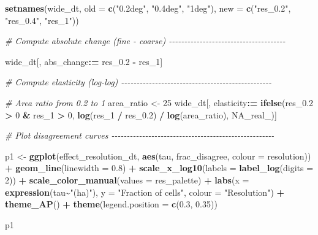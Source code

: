 \documentclass[
  11pt,
]{article}
\newenvironment{Shaded}{\begin{snugshade}}{\end{snugshade}}
\newcommand{\AttributeTok}[1]{\textcolor[rgb]{0.13,0.29,0.53}{#1}}
\newcommand{\CommentTok}[1]{\textcolor[rgb]{0.56,0.35,0.01}{\textit{#1}}}
\newcommand{\ConstantTok}[1]{\textcolor[rgb]{0.56,0.35,0.01}{#1}}
\newcommand{\DecValTok}[1]{\textcolor[rgb]{0.00,0.00,0.81}{#1}}
\newcommand{\FloatTok}[1]{\textcolor[rgb]{0.00,0.00,0.81}{#1}}
\newcommand{\FunctionTok}[1]{\textcolor[rgb]{0.13,0.29,0.53}{\textbf{#1}}}
\newcommand{\NormalTok}[1]{#1}
\newcommand{\OtherTok}[1]{\textcolor[rgb]{0.56,0.35,0.01}{#1}}
\newcommand{\SpecialCharTok}[1]{\textcolor[rgb]{0.81,0.36,0.00}{\textbf{#1}}}
\newcommand{\StringTok}[1]{\textcolor[rgb]{0.31,0.60,0.02}{#1}}
\begin{document}
\begin{Shaded}
\begin{Highlighting}[]
\FunctionTok{setnames}\NormalTok{(wide\_dt, }\AttributeTok{old =} \FunctionTok{c}\NormalTok{(}\StringTok{"0.2deg"}\NormalTok{, }\StringTok{"0.4deg"}\NormalTok{, }\StringTok{"1deg"}\NormalTok{), }\AttributeTok{new =} \FunctionTok{c}\NormalTok{(}\StringTok{"res\_0.2"}\NormalTok{, }\StringTok{"res\_0.4"}\NormalTok{, }\StringTok{"res\_1"}\NormalTok{))}

\CommentTok{\# Compute absolute change (fine {-} coarse) {-}{-}{-}{-}{-}{-}{-}{-}{-}{-}{-}{-}{-}{-}{-}{-}{-}{-}{-}{-}{-}{-}{-}{-}{-}{-}{-}{-}{-}{-}{-}{-}{-}{-}{-}{-}{-}{-}}

\NormalTok{wide\_dt[, abs\_change}\SpecialCharTok{:=}\NormalTok{ res\_0}\FloatTok{.2} \SpecialCharTok{{-}}\NormalTok{ res\_1]}

\CommentTok{\# Compute elasticity (log{-}log) {-}{-}{-}{-}{-}{-}{-}{-}{-}{-}{-}{-}{-}{-}{-}{-}{-}{-}{-}{-}{-}{-}{-}{-}{-}{-}{-}{-}{-}{-}{-}{-}{-}{-}{-}{-}{-}{-}{-}{-}{-}{-}{-}{-}{-}{-}{-}{-}{-}}

\CommentTok{\# Area ratio from 0.2 to 1}
\NormalTok{area\_ratio }\OtherTok{\textless{}{-}} \DecValTok{25}
\NormalTok{wide\_dt[, elasticity}\SpecialCharTok{:=} \FunctionTok{ifelse}\NormalTok{(res\_0}\FloatTok{.2} \SpecialCharTok{\textgreater{}} \DecValTok{0} \SpecialCharTok{\&}\NormalTok{ res\_1 }\SpecialCharTok{\textgreater{}} \DecValTok{0}\NormalTok{,}
                              \FunctionTok{log}\NormalTok{(res\_1 }\SpecialCharTok{/}\NormalTok{ res\_0}\FloatTok{.2}\NormalTok{) }\SpecialCharTok{/} \FunctionTok{log}\NormalTok{(area\_ratio), }\ConstantTok{NA\_real\_}\NormalTok{)]}

\CommentTok{\# Plot disagreement curves {-}{-}{-}{-}{-}{-}{-}{-}{-}{-}{-}{-}{-}{-}{-}{-}{-}{-}{-}{-}{-}{-}{-}{-}{-}{-}{-}{-}{-}{-}{-}{-}{-}{-}{-}{-}{-}{-}{-}{-}{-}{-}{-}{-}{-}{-}{-}{-}{-}{-}{-}{-}{-}}

\NormalTok{p1 }\OtherTok{\textless{}{-}} \FunctionTok{ggplot}\NormalTok{(effect\_resolution\_dt, }\FunctionTok{aes}\NormalTok{(tau, frac\_disagree, }\AttributeTok{colour =}\NormalTok{ resolution)) }\SpecialCharTok{+}
  \FunctionTok{geom\_line}\NormalTok{(}\AttributeTok{linewidth =} \FloatTok{0.8}\NormalTok{) }\SpecialCharTok{+}
  \FunctionTok{scale\_x\_log10}\NormalTok{(}\AttributeTok{labels =} \FunctionTok{label\_log}\NormalTok{(}\AttributeTok{digits =} \DecValTok{2}\NormalTok{)) }\SpecialCharTok{+}
  \FunctionTok{scale\_color\_manual}\NormalTok{(}\AttributeTok{values =}\NormalTok{ res\_palette) }\SpecialCharTok{+}
  \FunctionTok{labs}\NormalTok{(}\AttributeTok{x =} \FunctionTok{expression}\NormalTok{(tau}\SpecialCharTok{\textasciitilde{}}\StringTok{"(ha)"}\NormalTok{),}
       \AttributeTok{y =} \StringTok{"Fraction of cells"}\NormalTok{,}
       \AttributeTok{colour =} \StringTok{"Resolution"}\NormalTok{) }\SpecialCharTok{+}
  \FunctionTok{theme\_AP}\NormalTok{() }\SpecialCharTok{+}
  \FunctionTok{theme}\NormalTok{(}\AttributeTok{legend.position =} \FunctionTok{c}\NormalTok{(}\FloatTok{0.3}\NormalTok{, }\FloatTok{0.35}\NormalTok{))}

\NormalTok{p1}
\end{Highlighting}
\end{Shaded}
\end{document}
